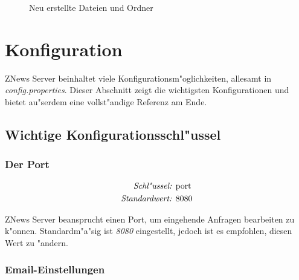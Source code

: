 \documentclass[12pt]{article}
\begin{document}
    \begin{figure}[htb]
        \caption{\label{fig:dirtree2}Neu erstellte Dateien und Ordner}
    \end{figure}

    \pagebreak
    \section{Konfiguration}%
    \label{sec:config}

    ZNews Server beinhaltet viele Konfigurationsm"oglichkeiten,
    allesamt in \emph{config.properties}.
    Dieser Abschnitt zeigt die wichtigsten Konfigurationen
    und bietet au"serdem eine vollst"andige Referenz am Ende.

    \subsection{Wichtige Konfigurationsschl"ussel}

    \subsubsection{Der Port} \label{sec:config:port}

    \begin{align*}
        \emph{Schl"ussel: } & \lstinline{port}\\
        \emph{Standardwert: } & \lstinline{8080}
    \end{align*}

    ZNews Server beansprucht einen Port, um eingehende
    Anfragen bearbeiten zu k"onnen. Standardm"a"sig ist
    \emph{8080} eingestellt, jedoch ist es empfohlen,
    diesen Wert zu "andern.

    \subsubsection{Email-Einstellungen}
\end{document}
